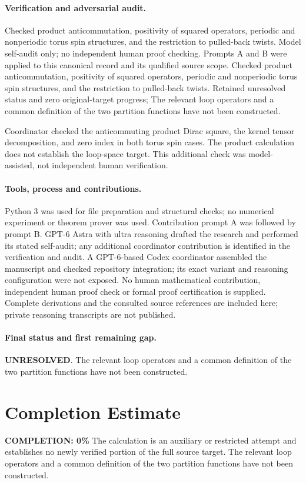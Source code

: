 \documentclass[11pt]{article}
\begin{document}
\paragraph{Verification and adversarial audit.}
Checked product anticommutation, positivity of squared operators, periodic and nonperiodic torus spin structures, and the restriction to pulled-back twists. Model self-audit only; no independent human proof checking. Prompts A and B were applied to this canonical record and its qualified source scope. Checked product anticommutation, positivity of squared operators, periodic and nonperiodic torus spin structures, and the restriction to pulled-back twists. Retained unresolved status and zero original-target progress; The relevant loop operators and a common definition of the two partition functions have not been constructed.

Coordinator checked the anticommuting product Dirac square, the kernel tensor decomposition, and zero index in both torus spin cases. The product calculation does not establish the loop-space target. This additional check was model-assisted, not independent human verification.

\paragraph{Tools, process and contributions.}
Python 3 was used for file preparation and structural checks; no numerical experiment or theorem prover was used. Contribution prompt A was followed by prompt B. GPT-6 Astra with ultra reasoning drafted the research and performed its stated self-audit; any additional coordinator contribution is identified in the verification and audit. A GPT-6-based Codex coordinator assembled the manuscript and checked repository integration; its exact variant and reasoning configuration were not exposed. No human mathematical contribution, independent human proof check or formal proof certification is supplied. Complete derivations and the consulted source references are included here; private reasoning transcripts are not published.

\paragraph{Final status and first remaining gap.}
\textbf{UNRESOLVED}. The relevant loop operators and a common definition of the two partition functions have not been constructed.

\section{Completion Estimate}
\noindent\textbf{COMPLETION: 0\%}
The calculation is an auxiliary or restricted attempt and establishes no newly verified portion of the full source target. The relevant loop operators and a common definition of the two partition functions have not been constructed.
\end{document}
